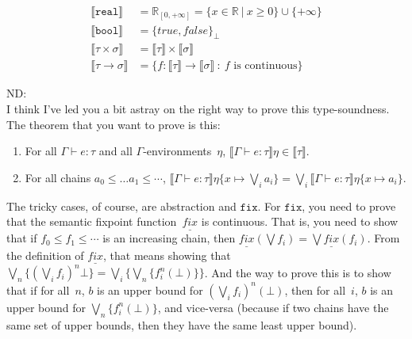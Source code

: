 \documentclass{westhesis}
\theoremstyle{plain}
\theoremstyle{definition}
\newenvironment{ndBlockComment}{\begin{oframed}\noindent ND:\\}{\end{oframed}}
\newcommand{\R}{\mathbb{R}}
\newcommand{\tmden}[2]{\llbracket{#1}\rrbracket{#2}}
\newcommand{\tyden}[1]{\llbracket{#1}\rrbracket}
\newcommand{\typing}[3]{{#1}\vdash{#2}:{#3}}
\newcommand{\extend}[3]{#1\{{#2}\mapsto{#3}\}}
\newcommand{\sfix}{\mathtt{fix}}
\newcommand{\smfix}{\underline{\mathit{fix}}}
\newcommand{\set}[1]{\{#1\}}
\let\bottom\bot
\begin{document}
 \begin{align*}
\llbracket \texttt{real} \rrbracket &= \R_{[0, +\infty]} = \{x \in \R \ | \ x \geq 0\} \cup \{+\infty\} \\
 \llbracket \texttt{bool} \rrbracket &= {\{true, false\}}_{\perp} \\
 \llbracket \tau \times \sigma \rrbracket &= \llbracket \tau \rrbracket \times \llbracket \sigma \rrbracket  \\
 \llbracket \tau \rightarrow \sigma \rrbracket &= \{f: \llbracket \tau \rrbracket \rightarrow \llbracket \sigma \rrbracket \ : 
 \ f \text{ is continuous}\}
 \end{align*}

\begin{ndBlockComment}
I think I've led you a bit astray on the right way to prove this
type-soundness.  The theorem that you want to prove is this:
\begin{enumerate}
\item For all $\Gamma\vdash e : \tau$ and all $\Gamma$-environments~$\eta$,
$\tmden{\typing\Gamma e\tau}\eta\in\tyden{\tau}$.
\item For all chains $a_0\leq\dots a_1\leq\dotsb$,
$\tmden{\typing\Gamma e\tau}{\extend\eta x {\bigvee_i a_i}} =
\bigvee_i\tmden{\typing\Gamma e\tau}{\extend\eta x {a_i}}$.
\end{enumerate}
The tricky cases, of course, are abstraction and $\sfix$.  For
$\sfix$, you need to prove that the semantic fixpoint function~$\smfix$
is continuous.  That is, you need to show that if $f_0\leq f_1\leq\dotsb$
is an increasing chain, then
$\smfix(\bigvee f_i) = \bigvee\smfix(f_i)$.  From the definition
of $\smfix$, that means showing that
$\bigvee_n\set{(\bigvee_i f_i)^n\bottom} =
\bigvee_i\set{\bigvee_n\set{f_i^n(\bottom)}}$.  And the way to prove this
is to show that if for all~$n$, $b$ is an upper bound for
$(\bigvee_i f_i)^n(\bot)$, then for all~$i$, $b$ is an upper bound
for $\bigvee_n\set{f_i^n(\bot)}$, and vice-versa (because if two chains
have the same set of upper bounds, then they have the same least upper
bound).
\end{ndBlockComment}
\end{document}
